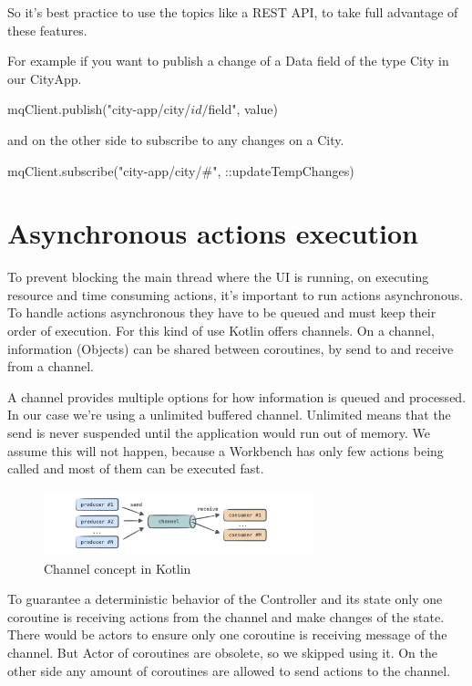 So it's best practice to use the topics like a REST API, to take full advantage of these features.

For example if you want to publish a change of a Data field of the type City in our CityApp.
\begin{kotlincode}
mqClient.publish("city-app/city/$id/$field", value)
\end{kotlincode}

and on the other side to subscribe to any changes on a City.
\begin{kotlincode}
mqClient.subscribe("city-app/city/#", ::updateTempChanges)
\end{kotlincode}


\section{Asynchronous actions execution}
To prevent blocking the main thread where the UI is running, on executing resource and time consuming actions, it's important to run actions asynchronous. To handle actions asynchronous they have to be queued and must keep their order of execution. For this kind of use Kotlin offers channels. 
On a channel, information (Objects) can be shared between coroutines, by send to and receive from a channel.

A channel provides multiple options for how information is queued and processed. In our case we're using a unlimited buffered channel. Unlimited means that the send is never suspended until the application would run out of memory.
We assume this will not happen, because a Workbench has only few actions being called and most of them can be executed fast.

\begin{center}
    \begin{figure}[H]
            \includegraphics[width=0.7\textwidth]{images/UsingChannelManyCoroutines.png}
            \centering
            \caption{Channel concept in Kotlin \citep{KotlinLang:Playground}}
   \end{figure}
\end{center} 

To guarantee a deterministic behavior of the Controller and its state only one coroutine is receiving actions from the channel and make changes of the state. There would be actors to ensure only one coroutine is receiving message of the channel. But Actor of coroutines are  obsolete, so we skipped using it. 
On the other side any amount of coroutines are allowed to send actions to the channel.


